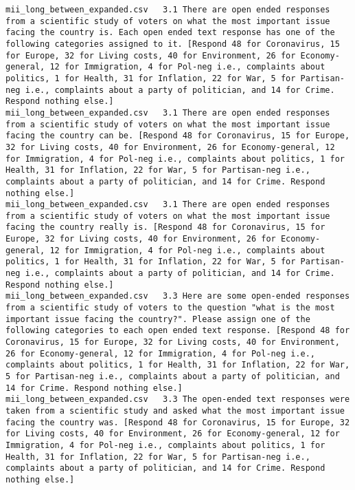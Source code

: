 \begin{lstlisting}[label=lst:promptvariants]
mii_long_between_expanded.csv	3.1	There are open ended responses from a scientific study of voters on what the most important issue facing the country is. Each open ended text response has one of the following categories assigned to it. [Respond 48 for Coronavirus, 15 for Europe, 32 for Living costs, 40 for Environment, 26 for Economy-general, 12 for Immigration, 4 for Pol-neg i.e., complaints about politics, 1 for Health, 31 for Inflation, 22 for War, 5 for Partisan-neg i.e., complaints about a party of politician, and 14 for Crime. Respond nothing else.]
mii_long_between_expanded.csv	3.1	There are open ended responses from a scientific study of voters on what the most important issue facing the country can be. [Respond 48 for Coronavirus, 15 for Europe, 32 for Living costs, 40 for Environment, 26 for Economy-general, 12 for Immigration, 4 for Pol-neg i.e., complaints about politics, 1 for Health, 31 for Inflation, 22 for War, 5 for Partisan-neg i.e., complaints about a party of politician, and 14 for Crime. Respond nothing else.]
mii_long_between_expanded.csv	3.1	There are open ended responses from a scientific study of voters on what the most important issue facing the country really is. [Respond 48 for Coronavirus, 15 for Europe, 32 for Living costs, 40 for Environment, 26 for Economy-general, 12 for Immigration, 4 for Pol-neg i.e., complaints about politics, 1 for Health, 31 for Inflation, 22 for War, 5 for Partisan-neg i.e., complaints about a party of politician, and 14 for Crime. Respond nothing else.]
mii_long_between_expanded.csv	3.3	Here are some open-ended responses from a scientific study of voters to the question "what is the most important issue facing the country?". Please assign one of the following categories to each open ended text response. [Respond 48 for Coronavirus, 15 for Europe, 32 for Living costs, 40 for Environment, 26 for Economy-general, 12 for Immigration, 4 for Pol-neg i.e., complaints about politics, 1 for Health, 31 for Inflation, 22 for War, 5 for Partisan-neg i.e., complaints about a party of politician, and 14 for Crime. Respond nothing else.]
mii_long_between_expanded.csv	3.3	The open-ended text responses were taken from a scientific study and asked what the most important issue facing the country was. [Respond 48 for Coronavirus, 15 for Europe, 32 for Living costs, 40 for Environment, 26 for Economy-general, 12 for Immigration, 4 for Pol-neg i.e., complaints about politics, 1 for Health, 31 for Inflation, 22 for War, 5 for Partisan-neg i.e., complaints about a party of politician, and 14 for Crime. Respond nothing else.]

\end{lstlisting}
